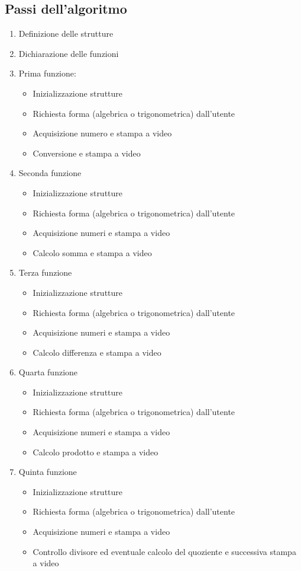 \documentclass[a4paper,10pt]{article}
\begin{document}
\subsection*{Passi dell'algoritmo}
\begin{enumerate}
	\item Definizione delle strutture
	\item Dichiarazione delle funzioni
	\item Prima funzione:
	    \begin{itemize}
	    	\item Inizializzazione strutture
		\item Richiesta forma (algebrica o trigonometrica) dall'utente
		\item Acquisizione numero e stampa a video
		\item Conversione e stampa a video
	    \end{itemize}
	\item Seconda funzione
	    \begin{itemize}
	    	\item Inizializzazione strutture
		\item Richiesta forma (algebrica o trigonometrica) dall'utente
		\item Acquisizione numeri e stampa a video
		\item Calcolo somma e stampa a video
	    \end{itemize}
	\item Terza funzione
	    \begin{itemize}
	    	\item Inizializzazione strutture
		\item Richiesta forma (algebrica o trigonometrica) dall'utente
		\item Acquisizione numeri e stampa a video
		\item Calcolo differenza e stampa a video
	    \end{itemize}
	\item Quarta funzione
	    \begin{itemize}
	    	\item Inizializzazione strutture
		\item Richiesta forma (algebrica o trigonometrica) dall'utente
		\item Acquisizione numeri e stampa a video
		\item Calcolo prodotto e stampa a video
	    \end{itemize}
	\item Quinta funzione
	    \begin{itemize}
	    	\item Inizializzazione strutture
		\item Richiesta forma (algebrica o trigonometrica) dall'utente
		\item Acquisizione numeri e stampa a video
		\item Controllo divisore ed eventuale calcolo del quoziente e successiva stampa a video
	    \end{itemize}
\end{enumerate}
\end{document}
